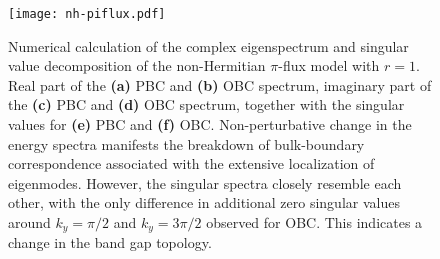 \begin{figure}[H]
\centering
\texttt{[image: nh-piflux.pdf]}
\caption[Numerical calculation of the complex eigenspectrum and singular value decomposition of the non-Hermitian $\pi$-flux model]{Numerical calculation of the complex eigenspectrum and singular value decomposition of the non-Hermitian $\pi$-flux model with $r = 1$. Real part of the \textbf{(a)} PBC and \textbf{(b)} OBC spectrum, imaginary part of the \textbf{(c)} PBC and \textbf{(d)} OBC spectrum, together with the singular values for \textbf{(e)} PBC and \textbf{(f)} OBC. Non-perturbative change in the energy spectra manifests the breakdown of bulk-boundary correspondence associated with the extensive localization of eigenmodes. However, the singular spectra closely resemble each other, with the only difference in additional zero singular values around $k_y = \pi / 2$ and  $k_y = 3 \pi / 2$ observed for OBC. This indicates a change in the band gap topology.}
\label{fig:num_spectrum}
\end{figure}

